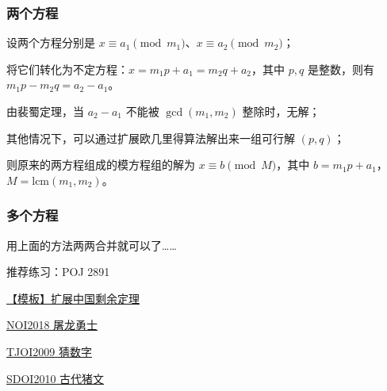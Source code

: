 \subsubsection{两个方程}

设两个方程分别是 $x\equiv a_1 \pmod {m_1}$、$x\equiv a_2 \pmod {m_2}$；

将它们转化为不定方程：$x=m_1p+a_1=m_2q+a_2$，其中 $p, q$ 是整数，则有 $m_1p-m_2q=a_2-a_1$。

由裴蜀定理，当 $a_2-a_1$ 不能被 $\gcd(m_1,m_2)$ 整除时，无解；

其他情况下，可以通过扩展欧几里得算法解出来一组可行解 $(p, q)$；

则原来的两方程组成的模方程组的解为 $x\equiv b\pmod M$，其中 $b=m_1p+a_1$，$M=\text{lcm}(m_1, m_2)$。

\subsubsection{多个方程}

用上面的方法两两合并就可以了……

推荐练习：POJ 2891

\href{https://www.luogu.org/problemnew/show/P4777}{【模板】扩展中国剩余定理}

\href{https://www.luogu.org/problemnew/show/P4774}{NOI2018 屠龙勇士}

\href{https://www.luogu.org/problemnew/show/P3868}{TJOI2009 猜数字}

\href{https://www.luogu.org/problemnew/show/P2480}{SDOI2010 古代猪文}
